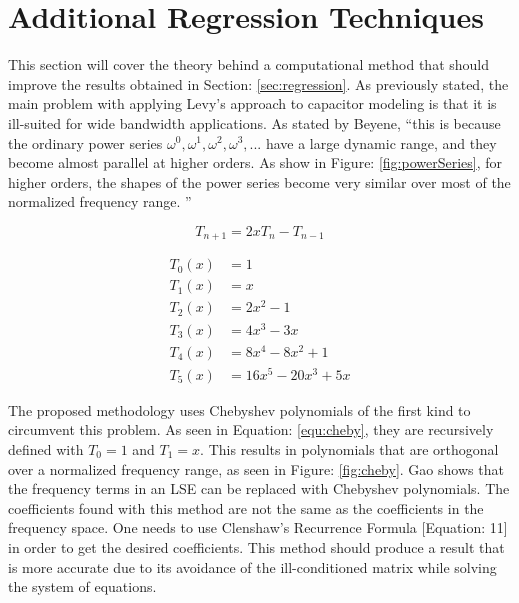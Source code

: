 \section{Additional Regression Techniques}
\label{app:adtl_regression}
\nocite{neu_ModelSynth}
\nocite{cuth_regression}
\nocite{bbc_chebyshev}



This section will cover the theory behind a computational method that should improve the results obtained in Section: \ref{sec:regression}. As previously stated, the main problem with applying Levy's approach to capacitor modeling is that it is ill-suited for wide bandwidth applications. As stated by Beyene, ``this is because the ordinary power series ${\omega ^0, \omega ^1, \omega ^2, \omega ^3,...}$ have a large dynamic range, and they become almost parallel at higher orders. As show in Figure: \ref{fig:powerSeries}, for higher orders, the shapes of the power series become very similar over most of the normalized frequency range. \cite{beyene_uwave}''

\begin{equation}
\label{equ:cheby}
T_{n+1} = 2xT_{n}-T_{n-1}
\end{equation}

\begin{equation}
    \label{equ:chebyPolys}
    \begin{split}
         T_0(x) &= 1           \\
         T_1(x) &= x           \\
         T_2(x) &= 2x^2-1      \\
         T_3(x) &= 4x^3-3x     \\
         T_4(x) &= 8x^4-8x^2+1 \\
         T_5(x) &= 16x^5-20x^3+5x
    \end{split}
\end{equation}

The proposed methodology uses Chebyshev polynomials of the first kind to circumvent this problem. As seen in Equation: \eqref{equ:cheby}, they are recursively defined with $T_0 = 1$ and $T_1 = x$. This results in polynomials that are orthogonal over a normalized frequency range, as seen in Figure: \ref{fig:cheby}. Gao\cite{gao_blackBox} shows that the frequency terms in an LSE can be replaced with Chebyshev polynomials. The coefficients found with this method are not the same as the coefficients in the frequency space. One needs to use Clenshaw's Recurrence Formula \cite{gao_blackBox}[Equation: 11] in order to get the desired coefficients. This method should produce a result that is more accurate due to its avoidance of the ill-conditioned matrix while solving the system of equations.



